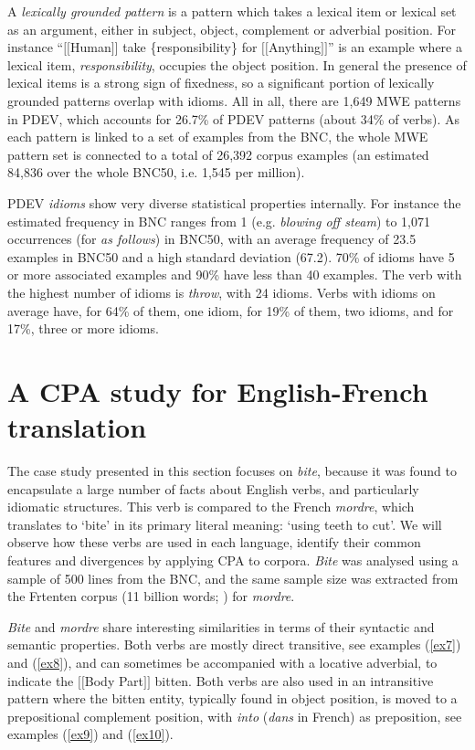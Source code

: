 \documentclass[output=paper]{langsci/langscibook}
\begin{document}
A \textit{lexically grounded pattern} is a pattern
which takes a lexical item or lexical set as an argument, either in
subject, object, complement or adverbial position. For instance
“$[$$[$Human$]$$]$ take \{responsibility\} for $[$$[$Anything$]$$]$” is an example
where a lexical item,  \textit{responsibility}, occupies the object position.
In general the presence of lexical items is a strong sign of fixedness,
so a significant portion of lexically grounded patterns overlap with
idioms. All in all, there are 1,649 MWE patterns in PDEV, which
accounts for 26.7\% of PDEV patterns (about 34\% of verbs). As each
pattern is linked to a set of examples from the BNC, the whole MWE
pattern set is connected to a total of 26,392 corpus examples (an
estimated 84,836 over the whole BNC50, i.e. 1,545 per million).



PDEV \textit{idioms} show very diverse statistical
properties internally. For instance the estimated frequency in BNC
ranges from 1 (e.g.  \textit{blowing off steam}) to 1,071 occurrences (for  \textit{as
follows}) in BNC50, with an average frequency of 23.5 examples in BNC50
and a high standard deviation (67.2). 70\% of idioms have 5 or more
associated examples and 90\% have less than 40 examples. The verb with
the highest number of idioms is \textit{throw}, with 24
idioms. Verbs with idioms on average have, for 64\% of them, one idiom,
for 19\% of them, two idioms, and for 17\%, three or more idioms. 

\section{A CPA study for English-French translation}

The case study presented in this section focuses on  \textit{bite}, because it
was found to encapsulate a large number of facts about English verbs,
and particularly idiomatic structures. This verb is compared to the
French  \textit{mordre}, which translates to `bite' in its primary literal
meaning: `using teeth to cut'. We will observe how these verbs are used
in each language, identify their common features and divergences by
applying CPA to corpora. \textit{Bite} was analysed using a sample of 500
lines from the BNC, and the same sample size was
extracted from the Frtenten corpus (11 billion words; \citealt{jakubicek2013}) for \textit{mordre}.



\textit{Bite} and \textit{mordre} share interesting similarities in terms of their
syntactic and semantic properties. Both verbs are mostly direct
transitive, see examples (\ref{ex7}) and (\ref{ex8}), and can sometimes be accompanied with a
locative adverbial, to indicate the $[$$[$Body Part$]$$]$ bitten. Both verbs
are also used in an intransitive pattern where the bitten entity,
typically found in object position, is moved to a prepositional
complement position, with \textit{into} (\textit{dans} in French) as preposition, see examples (\ref{ex9}) and (\ref{ex10}).
\end{document}
